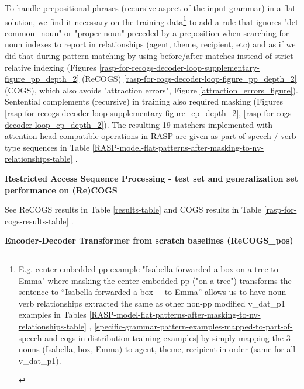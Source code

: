 \documentclass[11pt]{article}
\begin{document}
To handle prepositional phrases (recursive aspect of the input grammar) in a flat solution, we find it necessary on the training data\footnote{\begin{footnotesize}E.g. center embedded pp example "Isabella forwarded a box on a tree to Emma" where masking the center-embedded pp ("on a tree") transforms the sentence to “Isabella forwarded a box \_ to Emma” allows us to have noun-verb relationships extracted the same as other non-pp modified v\_dat\_p1 examples in Tables \ref{RASP-model-flat-patterns-after-masking-to-nv-relationships-table} , \ref{specific-grammar-pattern-examples-mapped-to-part-of-speech-and-cogs-in-distribution-training-examples} by simply mapping the 3 nouns (Isabella, box, Emma) to agent, theme, recipient in order (same for all v\_dat\_p1).\end{footnotesize}} to add a rule that ignores "det common\_noun" or "proper noun" preceded by a preposition when searching for noun indexes to report in relationships (agent, theme, recipient, etc) and as if we did that during pattern matching by using before/after matches instead of strict relative indexing (Figures \ref{rasp-for-recogs-decoder-loop-supplementary-figure_pp_depth_2} (ReCOGS) \ref{rasp-for-cogs-decoder-loop-figure_pp_depth_2} (COGS), which also avoids "attraction errors", Figure \ref{attraction_errors_figure}). Sentential complements (recursive) in training also required masking (Figures \ref{rasp-for-recogs-decoder-loop-supplementary-figure_cp_depth_2}, \ref{rasp-for-cogs-decoder-loop_cp_depth_2}). The resulting 19 matchers implemented with attention-head compatible operations in RASP are given as part of speech / verb type sequences in Table \ref{RASP-model-flat-patterns-after-masking-to-nv-relationships-table} .


\textbf{ Restricted Access Sequence Processing - test set and generalization set performance on (Re)COGS}

See ReCOGS results in Table \ref{results-table} and COGS results in Table \ref{rasp-for-cogs-results-table} .

\textbf{\citep{Wu2023} Encoder-Decoder Transformer from scratch baselines (ReCOGS\_pos)}
\end{document}
